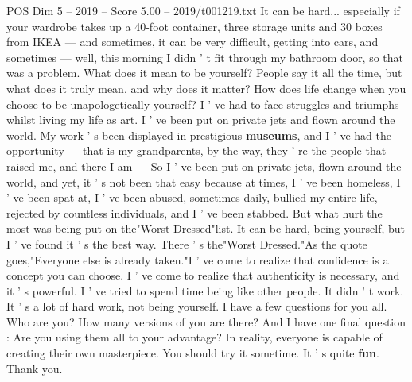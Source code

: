 \begin{textsample}{POS Dim 5 – 2019 – Score 5.00 – 2019/t001219.txt}
It can be hard... especially if your wardrobe takes up a 40-foot container, three storage units and 30 boxes from IKEA — and sometimes, it can be very difficult, getting into cars, and sometimes — well, this morning I didn ' t fit through my bathroom door, so that was a problem.
What does it mean to be yourself?
People say it all the time, but what does it truly mean, and why does it matter?
How does life change when you choose to be unapologetically yourself?
I ' ve had to face struggles and triumphs whilst living my life as art.
I ' ve been put on private jets and flown around the world.
My work ' s been displayed in prestigious \textbf{museums}, and I ' ve had the opportunity — that is my grandparents, by the way, they ' re the people that raised me, and there I am — So I ' ve been put on private jets, flown around the world, and yet, it ' s not been that easy because at times, I ' ve been homeless, I ' ve been spat at, I ' ve been abused, sometimes daily, bullied my entire life, rejected by countless individuals, and I ' ve been stabbed.
But what hurt the most was being put on the"Worst Dressed"list.
It can be hard, being yourself, but I ' ve found it ' s the best way.
There ' s the"Worst Dressed."As the quote goes,"Everyone else is already taken."I ' ve come to realize that confidence is a concept you can choose.
I ' ve come to realize that authenticity is necessary, and it ' s powerful.
I ' ve tried to spend time being like other people.
It didn ' t work.
It ' s a lot of hard work, not being yourself.
I have a few questions for you all.
Who are you?
How many versions of you are there?
And I have one final question : Are you using them all to your advantage?
In reality, everyone is capable of creating their own masterpiece.
You should try it sometime.
It ' s quite \textbf{fun}.
Thank you.

\end{textsample}
